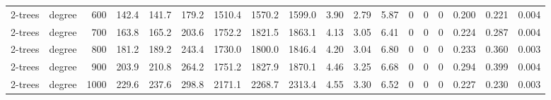 \begin{tabular}{llr rrr rrr rrr rrr rrr}
2-trees & degree & 600 & 142.4 & 141.7 & 179.2 & 1510.4 & 1570.2 & 1599.0 & 3.90 & 2.79 & 5.87 & 0 & 0 & 0 & 0.200 & 0.221 & 0.004 \\
2-trees & degree & 700 & 163.8 & 165.2 & 203.6 & 1752.2 & 1821.5 & 1863.1 & 4.13 & 3.05 & 6.41 & 0 & 0 & 0 & 0.224 & 0.287 & 0.004 \\
2-trees & degree & 800 & 181.2 & 189.2 & 243.4 & 1730.0 & 1800.0 & 1846.4 & 4.20 & 3.04 & 6.80 & 0 & 0 & 0 & 0.233 & 0.360 & 0.003 \\
2-trees & degree & 900 & 203.9 & 210.8 & 264.2 & 1751.2 & 1827.9 & 1870.1 & 4.46 & 3.25 & 6.68 & 0 & 0 & 0 & 0.294 & 0.399 & 0.004 \\
2-trees & degree & 1000 & 229.6 & 237.6 & 298.8 & 2171.1 & 2268.7 & 2313.4 & 4.55 & 3.30 & 6.52 & 0 & 0 & 0 & 0.227 & 0.230 & 0.003 \\
\bottomrule
\end{tabular}
